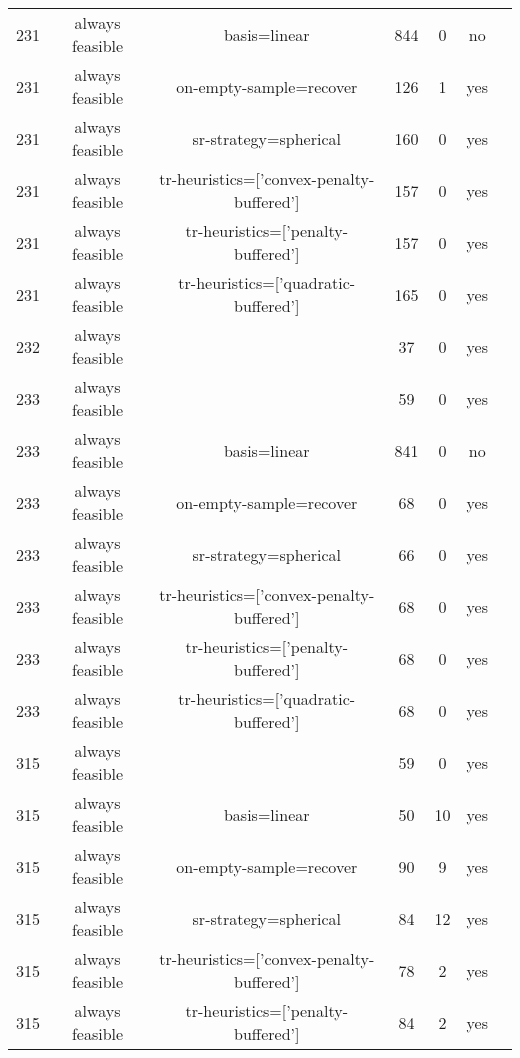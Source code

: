 \begin{footnotesize}
\begin{center}
\begin{longtable}{ccccccc}
231 & always feasible &                              basis=linear &    844 &      0 &      no\\
231 & always feasible &                   on-empty-sample=recover &    126 &      1 &     yes\\
231 & always feasible &                     sr-strategy=spherical &    160 &      0 &     yes\\
231 & always feasible & tr-heuristics=['convex-penalty-buffered'] &    157 &      0 &     yes\\
231 & always feasible &        tr-heuristics=['penalty-buffered'] &    157 &      0 &     yes\\
231 & always feasible &      tr-heuristics=['quadratic-buffered'] &    165 &      0 &     yes\\
232 & always feasible &                                           &     37 &      0 &     yes\\
233 & always feasible &                                           &     59 &      0 &     yes\\
233 & always feasible &                              basis=linear &    841 &      0 &      no\\
233 & always feasible &                   on-empty-sample=recover &     68 &      0 &     yes\\
233 & always feasible &                     sr-strategy=spherical &     66 &      0 &     yes\\
233 & always feasible & tr-heuristics=['convex-penalty-buffered'] &     68 &      0 &     yes\\
233 & always feasible &        tr-heuristics=['penalty-buffered'] &     68 &      0 &     yes\\
233 & always feasible &      tr-heuristics=['quadratic-buffered'] &     68 &      0 &     yes\\
315 & always feasible &                                           &     59 &      0 &     yes\\
315 & always feasible &                              basis=linear &     50 &     10 &     yes\\
315 & always feasible &                   on-empty-sample=recover &     90 &      9 &     yes\\
315 & always feasible &                     sr-strategy=spherical &     84 &     12 &     yes\\
315 & always feasible & tr-heuristics=['convex-penalty-buffered'] &     78 &      2 &     yes\\
315 & always feasible &        tr-heuristics=['penalty-buffered'] &     84 &      2 &     yes\\

\end{longtable}
\end{center}
\end{footnotesize}
